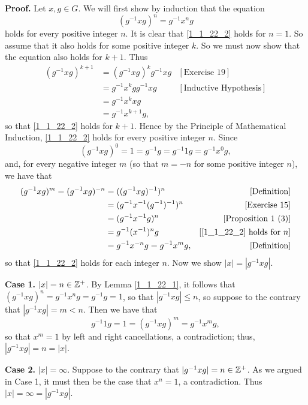 \begin{enumerate}
      \textbf{Proof.} Let $x, g \in G$. We will first show by induction that the 
      equation
      \begin{equation}
         (g^{-1}xg)^n = g^{-1}x^ng \label{1_1_22_2}
      \end{equation}
      holds for every positive integer $n$. It is clear that \eqref{1_1_22_2} 
      holds for $n = 1$. So assume that it also holds for some positive integer 
      $k$. So we must now show that the equation also holds for $k + 1$. Thus
      \begin{align*}
         (g^{-1}xg)^{k+1} &= (g^{-1}xg)^kg^{-1}xg &[\text{Exercise 19}] \\
                     &= g^{-1}x^kgg^{-1}xg &[\text{Inductive Hypothesis}] \\
                     &= g^{-1}x^kxg \\
                     &= g^{-1}x^{k+1}g,
      \end{align*}
      so that \eqref{1_1_22_2} holds for $k+1$. Hence by the Principle 
      of Mathematical Induction, \eqref{1_1_22_2} holds for every positive 
      integer $n$. Since
      $$(g^{-1}xg)^0 = 1 = g^{-1}g = g^{-1}1g = g^{-1}x^0g,$$
      and, for every negative integer $m$ (so that $m = -n$ for some positive
      integer $n$), we have that
      \begin{align*}
         (g^{-1}xg)^m = (g^{-1}xg)^{-n} &= ((g^{-1}xg)^{-1})^n
            &[\text{Definition}] \\
            &= (g^{-1}x^{-1}(g^{-1})^{-1})^n &[\text{Exercise 15}] \\
            &= (g^{-1}x^{-1}g)^n           &[\text{Proposition 1 (3)}] \\
            &= g^{-1}(x^{-1})^ng     &[\eqref{1_1_22_2} \text{ holds for } n] \\
            &= g^{-1}x^{-n}g = g^{-1}x^mg, &[\text{Definition}]
      \end{align*}
      so that \eqref{1_1_22_2} holds for each integer $n$. Now we show
      $|x| = |g^{-1}xg|$.

      \textbf{Case 1.} \textit{$|x| = n \in \mathbb{Z}^+$}. By Lemma \ref{1_1_22_1}, it 
      follows that $(g^{-1}xg)^n = g^{-1}x^ng = g^{-1}g =1$, so that
      $|g^{-1}xg| \le n$, so suppose to the contrary that $|g^{-1}xg| = m < n$. 
      Then we have that
      $$g^{-1}1g = 1 = (g^{-1}xg)^m = g^{-1}x^mg,$$
      so that $x^m = 1$ by left and right cancellations, a contradiction; thus,  
      $|g^{-1}xg| = n = |x|$.

      \textbf{Case 2.} \textit{$|x| = \infty$}. Suppose to the contrary that
      $|g^{-1}xg| = n \in \mathbb{Z}^+$. As we argued in Case 1, it must then be the 
      case that $x^n = 1$, a contradiction. Thus $|x| = \infty = |g^{-1}xg|$.


\end{enumerate}
